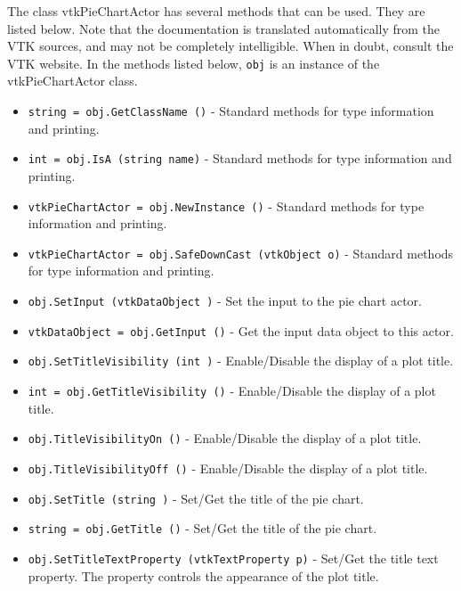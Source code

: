 The class vtkPieChartActor has several methods that can be used.
  They are listed below.
Note that the documentation is translated automatically from the VTK sources,
and may not be completely intelligible.  When in doubt, consult the VTK website.
In the methods listed below, \verb|obj| is an instance of the vtkPieChartActor class.
\begin{itemize}
\item  \verb|string = obj.GetClassName ()| -  Standard methods for type information and printing.

\item  \verb|int = obj.IsA (string name)| -  Standard methods for type information and printing.

\item  \verb|vtkPieChartActor = obj.NewInstance ()| -  Standard methods for type information and printing.

\item  \verb|vtkPieChartActor = obj.SafeDownCast (vtkObject o)| -  Standard methods for type information and printing.

\item  \verb|obj.SetInput (vtkDataObject )| -  Set the input to the pie chart actor.

\item  \verb|vtkDataObject = obj.GetInput ()| -  Get the input data object to this actor.

\item  \verb|obj.SetTitleVisibility (int )| -  Enable/Disable the display of a plot title.

\item  \verb|int = obj.GetTitleVisibility ()| -  Enable/Disable the display of a plot title.

\item  \verb|obj.TitleVisibilityOn ()| -  Enable/Disable the display of a plot title.

\item  \verb|obj.TitleVisibilityOff ()| -  Enable/Disable the display of a plot title.

\item  \verb|obj.SetTitle (string )| -  Set/Get the title of the pie chart.

\item  \verb|string = obj.GetTitle ()| -  Set/Get the title of the pie chart.

\item  \verb|obj.SetTitleTextProperty (vtkTextProperty p)| -  Set/Get the title text property. The property controls the
 appearance of the plot title.


\end{itemize}
